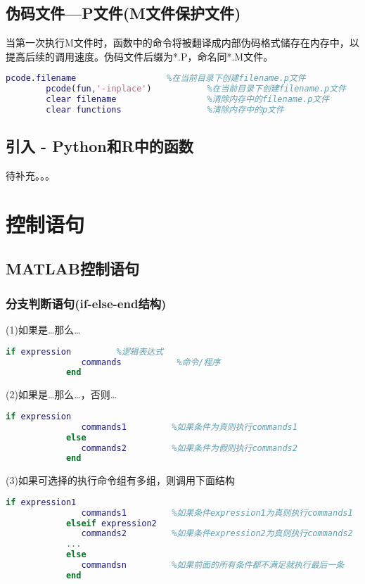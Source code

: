     \subsection{伪码文件—P文件(M文件保护文件)}
        当第一次执行M文件时，函数中的命令将被翻译成内部伪码格式储存在内存中，以提高后续的调用速度。伪码文件后缀为*.P，命名同*.M文件。
            \begin{lstlisting}[language=Matlab]
        pcode.filename                  %在当前目录下创建filename.p文件
        pcode(fun,'-inplace')           %在当前目录下创建filename.p文件
        clear filename                  %清除内存中的filename.p文件
        clear functions                 %清除内存中的p文件
            \end{lstlisting}
    \subsection{引入 - Python和R中的函数}
        \par
        待补充。。。

\section{控制语句}
    \subsection{MATLAB控制语句}
        \subsubsection{分支判断语句(if-else-end结构)}
            \par
            (1)如果是…那么…
             \begin{lstlisting}[language=Matlab]
            if expression         %逻辑表达式
               commands           %命令/程序
            end
            \end{lstlisting}
            \par
            (2)如果是…那么…，否则…
            \begin{lstlisting}[language=Matlab]
            if expression
               commands1         %如果条件为真则执行commands1
            else
               commands2         %如果条件为假则执行commands2
            end
            \end{lstlisting}
            \par
            (3)如果可选择的执行命令组有多组，则调用下面结构
            \begin{lstlisting}[language=Matlab]
            if expression1
               commands1         %如果条件expression1为真则执行commands1
            elseif expression2
               commands2         %如果条件expression2为真则执行commands2
            ...
            else
               commandsn         %如果前面的所有条件都不满足就执行最后一条
            end
                \end{lstlisting}
